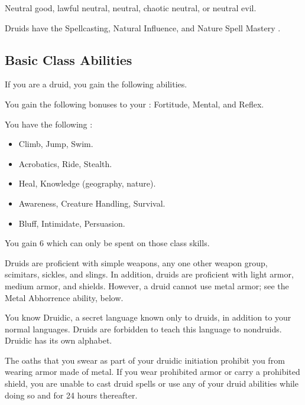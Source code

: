      Neutral good, lawful neutral, neutral, chaotic neutral, or neutral evil.

     Druids have the Spellcasting, Natural Influence, and Nature Spell Mastery .

    \subsection{Basic Class Abilities}
        If you are a druid, you gain the following abilities.

        You gain the following bonuses to your :  Fortitude,  Mental, and  Reflex.

        You have the following :
        \begin{itemize}
            \item {} Climb, Jump, Swim.
            \item {} Acrobatics, Ride, Stealth.
            \item {} Heal, Knowledge (geography, nature).
            \item {} Awareness, Creature Handling, Survival.
            \item {} Bluff, Intimidate, Persuasion.
        \end{itemize}
        You gain 6  which can only be spent on those class skills.

        Druids are proficient with simple weapons, any one other weapon group, scimitars, sickles, and slings.
        In addition, druids are proficient with light armor, medium armor, and shields.
        However, a druid cannot use metal armor; see the Metal Abhorrence ability, below.

        You know Druidic, a secret language known only to druids, in addition to your normal languages.
        Druids are forbidden to teach this language to nondruids.
        Druidic has its own alphabet.

        The oaths that you swear as part of your druidic initiation prohibit you from wearing armor made of metal.
        If you wear prohibited armor or carry a prohibited shield, you are unable to cast druid spells or use any of your  druid abilities while doing so and for 24 hours thereafter.


